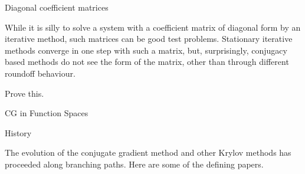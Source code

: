 \documentclass[11pt]{artikel3}
\begin{document}
\begin{Outline}
 {Diagonal coefficient matrices}

While it is silly to solve a system with a coefficient matrix of
diagonal form by an iterative method, such matrices can be good test
problems. Stationary iterative methods converge in one step with such
a matrix, but, surprisingly, conjugacy based methods do not see the
form of the matrix, other than through different roundoff behaviour.

\begin{question}Prove this.\end{question}

 {CG in Function Spaces}



 {History}

The evolution of the conjugate gradient method and other Krylov
methods has proceeded along branching paths. Here are some
of the defining papers.


\end{Outline}
\end{document}
